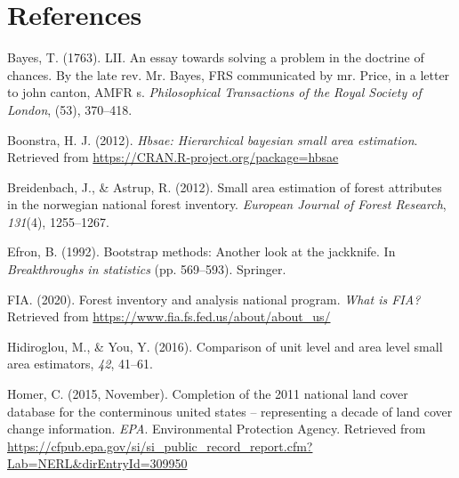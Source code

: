 \documentclass[12pt,twoside]{reedthesis}
\newlength{\cslhangindent}
\newenvironment{CSLReferences}[2] %
 {%
  \setlength{\parindent}{0pt}
  \ifodd #1 \everypar{\setlength{\hangindent}{\cslhangindent}}\ignorespaces\fi
  \ifnum #2 > 0
  \setlength{\parskip}{#2\baselineskip}
  \fi
 }%
 {}
\begin{document}
\hypertarget{references}{%
\chapter*{References}\label{references}}


\noindent

\setlength{\parindent}{-0.20in}
\setlength{\leftskip}{0.20in}
\setlength{\parskip}{8pt}

\hypertarget{refs}{}
\begin{CSLReferences}{1}{0}
\leavevmode{}%
Bayes, T. (1763). LII. An essay towards solving a problem in the doctrine of chances. By the late rev. Mr. Bayes, FRS communicated by mr. Price, in a letter to john canton, AMFR s. \emph{Philosophical Transactions of the Royal Society of London}, (53), 370--418.

\leavevmode{}%
Boonstra, H. J. (2012). \emph{Hbsae: Hierarchical bayesian small area estimation}. Retrieved from \url{https://CRAN.R-project.org/package=hbsae}

\leavevmode{}%
Breidenbach, J., \& Astrup, R. (2012). Small area estimation of forest attributes in the norwegian national forest inventory. \emph{European Journal of Forest Research}, \emph{131}(4), 1255--1267.

\leavevmode{}%
Efron, B. (1992). Bootstrap methods: Another look at the jackknife. In \emph{Breakthroughs in statistics} (pp. 569--593). Springer.

\leavevmode{}%
FIA. (2020). Forest inventory and analysis national program. \emph{What is FIA?} Retrieved from \url{https://www.fia.fs.fed.us/about/about_us/}

\leavevmode{}%
Hidiroglou, M., \& You, Y. (2016). Comparison of unit level and area level small area estimators, \emph{42}, 41--61.

\leavevmode{}%
Homer, C. (2015, November). Completion of the 2011 national land cover database for the conterminous united states -- representing a decade of land cover change information. \emph{EPA}. Environmental Protection Agency. Retrieved from \url{https://cfpub.epa.gov/si/si_public_record_report.cfm?Lab=NERL\&dirEntryId=309950}


\end{CSLReferences}
\end{document}
